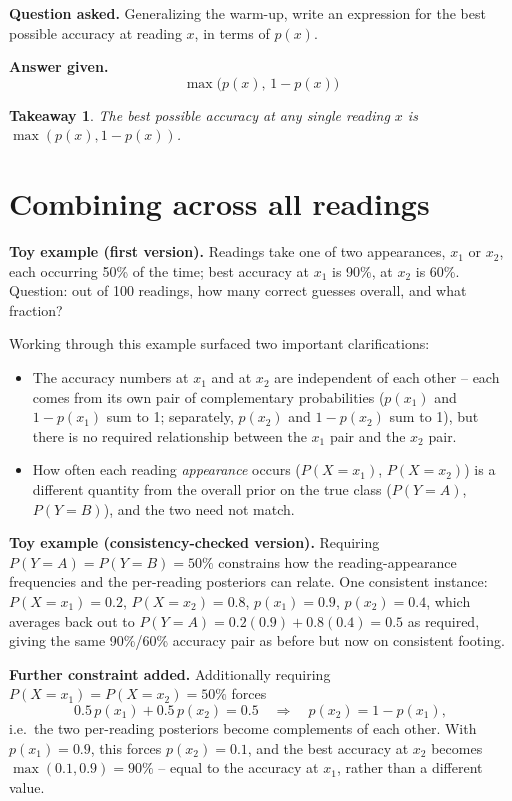 \documentclass[11pt]{article}
\newtheorem*{takeaway}{Takeaway}
\begin{document}
\textbf{Question asked.} Generalizing the warm-up, write an expression for
the best possible accuracy at reading $x$, in terms of $p(x)$.

\textbf{Answer given.}
\[
  \max\big(p(x),\, 1-p(x)\big)
\]

\begin{takeaway}
The best possible accuracy at any single reading $x$ is $\max(p(x), 1-p(x))$.
\end{takeaway}

\section{Combining across all readings}

\textbf{Toy example (first version).} Readings take one of two appearances,
$x_1$ or $x_2$, each occurring 50\% of the time; best accuracy at $x_1$ is
90\%, at $x_2$ is 60\%. Question: out of 100 readings, how many correct
guesses overall, and what fraction?

Working through this example surfaced two important clarifications:

\begin{itemize}
  \item The accuracy numbers at $x_1$ and at $x_2$ are independent of each
  other -- each comes from its own pair of complementary probabilities
  ($p(x_1)$ and $1-p(x_1)$ sum to 1; separately, $p(x_2)$ and $1-p(x_2)$ sum
  to 1), but there is no required relationship between the $x_1$ pair and
  the $x_2$ pair.
  \item How often each reading \emph{appearance} occurs ($P(X=x_1)$,
  $P(X=x_2)$) is a different quantity from the overall prior on the true
  class ($P(Y=A)$, $P(Y=B)$), and the two need not match.
\end{itemize}

\textbf{Toy example (consistency-checked version).} Requiring $P(Y=A) =
P(Y=B) = 50\%$ constrains how the reading-appearance frequencies and the
per-reading posteriors can relate. One consistent instance: $P(X=x_1) =
0.2$, $P(X=x_2) = 0.8$, $p(x_1) = 0.9$, $p(x_2) = 0.4$, which averages back
out to $P(Y=A) = 0.2(0.9) + 0.8(0.4) = 0.5$ as required, giving the same
90\%/60\% accuracy pair as before but now on consistent footing.

\textbf{Further constraint added.} Additionally requiring $P(X=x_1) =
P(X=x_2) = 50\%$ forces
\[
  0.5\,p(x_1) + 0.5\,p(x_2) = 0.5 \quad\Longrightarrow\quad p(x_2) = 1 - p(x_1),
\]
i.e.\ the two per-reading posteriors become complements of each other. With
$p(x_1) = 0.9$, this forces $p(x_2) = 0.1$, and the best accuracy at $x_2$
becomes $\max(0.1, 0.9) = 90\%$ -- equal to the accuracy at $x_1$, rather
than a different value.
\end{document}

